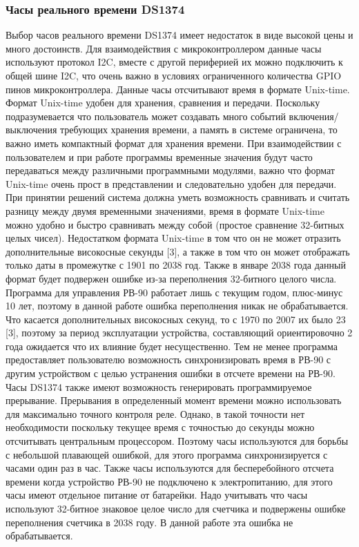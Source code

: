 \subsubsection{ Часы реального времени DS1374}
Выбор часов реального времени DS1374 имеет недостаток в виде высокой цены и много достоинств. 
Для взаимодействия с микроконтроллером данные часы используют протокол I2C, вместе с другой периферией их можно подключить к общей шине I2C, что очень важно в условиях ограниченного количества GPIO пинов  микроконтроллера.
Данные часы отсчитывают время в формате Unix-time. Формат Unix-time удобен для хранения, сравнения и передачи. Поскольку подразумевается что пользователь может создавать много событий включения/выключения требующих хранения времени, а память в системе ограничена, то важно иметь компактный формат для хранения времени. При взаимодействии с пользователем и при работе программы временные значения будут часто передаваться между различными программными модулями, важно что формат Unix-time очень прост в представлении и следовательно удобен для передачи. При принятии решений система должна уметь возможность сравнивать и считать разницу между двумя временными значениями, время в формате Unix-time можно удобно и быстро сравнивать между собой (простое сравнение 32-битных целых чисел). Недостатком формата Unix-time в том что он не может отразить дополнительные високосные секунды [3], а также в том что он может отображать только даты в промежутке с 1901 по 2038 год. Также в январе 2038 года данный формат будет подвержен ошибке из-за переполнения 32-битного целого числа. Программа для управления РВ-90 работает лишь с текущим годом, плюс-минус 10 лет, поэтому в данной работе ошибка переполнения никак не обрабатывается. Что касается дополнительных високосных секунд, то с 1970 по 2007 их было 23 [3], поэтому за период эксплуатации устройства, составляющий ориентировочно 2 года ожидается что их влияние будет несущественно. Тем не менее программа предоставляет пользователю возможность синхронизировать время в РВ-90 с другим устройством с целью устранения ошибки в отсчете времени на РВ-90. Часы DS1374 также имеют возможность генерировать программируемое прерывание.
Прерывания в определенный момент времени можно использовать для максимально точного контроля реле. Однако, в такой точности нет необходимости поскольку текущее время с точностью до секунды можно отсчитывать центральным процессором. Поэтому часы используются для борьбы с небольшой плавающей ошибкой, для этого программа синхронизируется с часами один раз в час. Также часы используются для бесперебойного отсчета времени когда устройство РВ-90 не подключено к электропитанию, для этого часы имеют отдельное питание от батарейки. Надо учитывать что часы используют 32-битное знаковое целое число для счетчика и подвержены ошибке переполнения счетчика в 2038 году. В данной работе эта ошибка не обрабатывается.  
